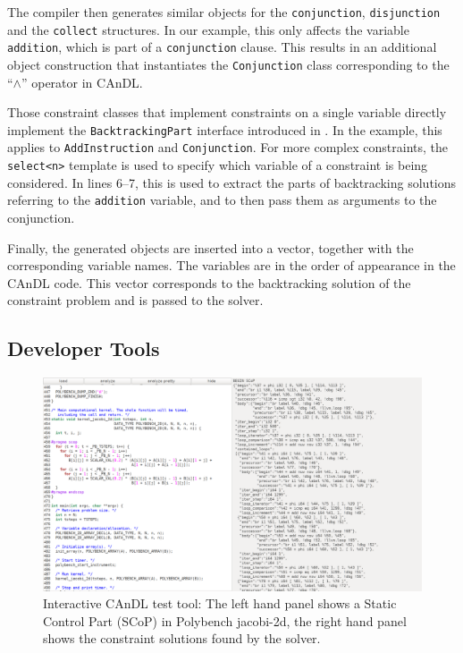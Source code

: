     The compiler then generates similar objects for the
    \texttt{conjunction}, \texttt{disjunction} and the \texttt{collect} structures.
    In our example, this only affects the variable \texttt{addition}, which is
    part of a \texttt{conjunction} clause.
    This results in an additional object construction that instantiates the
    \texttt{Conjunction} class corresponding to the ``$\land$'' operator
    in CAnDL.

    Those constraint classes that implement constraints on a single variable
    directly implement the \texttt{BacktrackingPart} interface introduced in
    .
    In the example, this applies to \texttt{AddInstruction} and
    \texttt{Conjunction}.
    For more complex constraints, the \texttt{select<n>} template is used to
    specify which variable of a constraint is being considered.
    In lines 6--7, this is used to extract the parts of backtracking solutions
    referring to the \texttt{addition} variable, and to then pass them as
    arguments to the conjunction.

    Finally, the generated objects are inserted into a vector, together with the
    corresponding variable names.
    The variables are in the order of appearance in the CAnDL code.
    This vector corresponds to the backtracking solution of the constraint
    problem and is passed to the solver.

\subsection{Developer Tools}

\begin{figure}[t]
\centering
\includegraphics[width=\textwidth]{figures/visual_gui2.png}
\caption{Interactive CAnDL test tool: The left hand panel shows a Static Control
        Part (SCoP) in Polybench jacobi-2d, the right hand panel shows the
        constraint solutions found by the solver.
        \parfillskip=0pt}
\label{fig:gui}
\end{figure}

